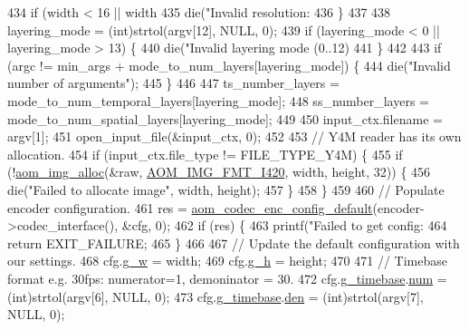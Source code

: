 \begin{DoxyCodeInclude}
{{{{{{{{{{434   \textcolor{keywordflow}{if} (width < 16 || width %
435     die(\textcolor{stringliteral}{"Invalid resolution: %
436   \}
437 
438   layering\_mode = (int)strtol(argv[12], NULL, 0);
439   \textcolor{keywordflow}{if} (layering\_mode < 0 || layering\_mode > 13) \{
440     die(\textcolor{stringliteral}{"Invalid layering mode (0..12) %
441   \}
442 
443   \textcolor{keywordflow}{if} (argc != min\_args + mode\_to\_num\_layers[layering\_mode]) \{
444     die(\textcolor{stringliteral}{"Invalid number of arguments"});
445   \}
446 
447   ts\_number\_layers = mode\_to\_num\_temporal\_layers[layering\_mode];
448   ss\_number\_layers = mode\_to\_num\_spatial\_layers[layering\_mode];
449 
450   input\_ctx.filename = argv[1];
451   open\_input\_file(&input\_ctx, 0);
452 
453   \textcolor{comment}{// Y4M reader has its own allocation.}
454   \textcolor{keywordflow}{if} (input\_ctx.file\_type != FILE\_TYPE\_Y4M) \{
455     \textcolor{keywordflow}{if} (!\hyperlink{aom__image_8h_a570db29fbd122951235a08fe9375f6bb}{aom\_img\_alloc}(&raw, \hyperlink{aom__image_8h_a930317c04b4bd0a660bb5e744055523cabd778a3d697463e89d12a1117f417b60}{AOM\_IMG\_FMT\_I420}, width, height, 32)) \{
456       die(\textcolor{stringliteral}{"Failed to allocate image"}, width, height);
457     \}
458   \}
459 
460   \textcolor{comment}{// Populate encoder configuration.}
461   res = \hyperlink{group__encoder_gabe456ab6f99bdebc47018779b75d2521}{aom\_codec\_enc\_config\_default}(encoder->codec\_interface(), &cfg, 0);
462   \textcolor{keywordflow}{if} (res) \{
463     printf(\textcolor{stringliteral}{"Failed to get config: %
464     \textcolor{keywordflow}{return} EXIT\_FAILURE;
465   \}
466 
467   \textcolor{comment}{// Update the default configuration with our settings.}
468   cfg.\hyperlink{structaom__codec__enc__cfg_a80cb459c5ef3c7e1516f617c4c9d6eab}{g\_w} = width;
469   cfg.\hyperlink{structaom__codec__enc__cfg_a37b0f57b63bec8d133df8901d4407ee6}{g\_h} = height;
470 
471   \textcolor{comment}{// Timebase format e.g. 30fps: numerator=1, demoninator = 30.}
472   cfg.\hyperlink{structaom__codec__enc__cfg_a10664f1fc5b6ec29b77ee13efeeecdf7}{g\_timebase}.\hyperlink{structaom__rational_a7b48174411798c780a15f132c4650839}{num} = (int)strtol(argv[6], NULL, 0);
473   cfg.\hyperlink{structaom__codec__enc__cfg_a10664f1fc5b6ec29b77ee13efeeecdf7}{g\_timebase}.\hyperlink{structaom__rational_adeddf2ea01c12b7be66536e0a0fb92c5}{den} = (int)strtol(argv[7], NULL, 0);
}}}}}}}}}}}}}
\end{DoxyCodeInclude}
